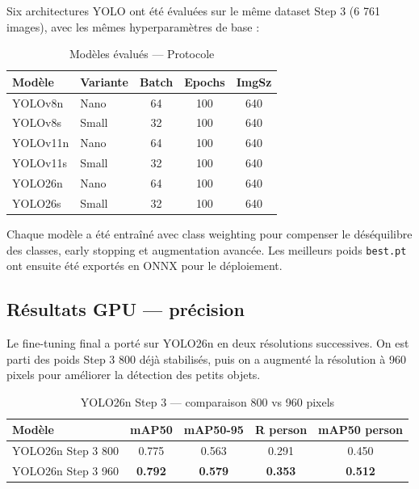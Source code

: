 Six architectures YOLO ont été évaluées
sur le même dataset Step 3 (6 761 images),
avec les mêmes hyperparamètres de base :

\begin{table}[H]
\centering
\caption{Modèles évalués — Protocole}
\begin{tabularx}{\textwidth}{llccc}
\toprule
\textbf{Modèle} &
\textbf{Variante} &
\textbf{Batch} &
\textbf{Epochs} &
\textbf{ImgSz} \\
\midrule
YOLOv8n  & Nano  & 64 & 100 & 640 \\
YOLOv8s  & Small & 32 & 100 & 640 \\
YOLOv11n & Nano  & 64 & 100 & 640 \\
YOLOv11s & Small & 32 & 100 & 640 \\
YOLO26n  & Nano  & 64 & 100 & 640 \\
YOLO26s  & Small & 32 & 100 & 640 \\
\bottomrule
\end{tabularx}
\label{tab:benchmark_protocol}
\end{table}

Chaque modèle a été entraîné avec
class weighting pour compenser le
déséquilibre des classes, early stopping
et augmentation avancée. Les meilleurs
poids \texttt{best.pt} ont ensuite été
exportés en ONNX pour le déploiement.

\subsection{Résultats GPU — précision}

Le fine-tuning final a porté sur YOLO26n
en deux résolutions successives. On est
parti des poids Step 3 800 déjà stabilisés,
puis on a augmenté la résolution à 960
pixels pour améliorer la détection des
petits objets.

\begin{table}[H]
\centering
\caption{YOLO26n Step 3 — comparaison
         800 vs 960 pixels}
\small
\begin{tabularx}{\textwidth}{Xcccc}
\toprule
\textbf{Modèle} &
\textbf{mAP50} &
\textbf{mAP50-95} &
\textbf{R person} &
\textbf{mAP50 person} \\
\midrule
YOLO26n Step 3 800 &
0.775 & 0.563 & 0.291 & 0.450 \\
\rowcolor{PrimaryBlue!10}
YOLO26n Step 3 960 &
\textbf{0.792} & \textbf{0.579} &
\textbf{0.353} & \textbf{0.512} \\
\bottomrule
\end{tabularx}
\label{tab:gpu_benchmark}
\end{table}

